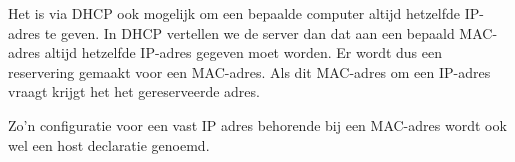 Het is via DHCP ook mogelijk om een bepaalde computer altijd hetzelfde IP-adres te geven. In DHCP vertellen we de server dan dat aan een bepaald MAC-adres altijd hetzelfde IP-adres gegeven moet worden. Er wordt dus een reservering gemaakt voor een MAC-adres. Als dit MAC-adres om een IP-adres vraagt krijgt het het gereserveerde adres.

Zo'n configuratie voor een vast IP adres behorende bij een MAC-adres wordt ook wel een host declaratie genoemd.
